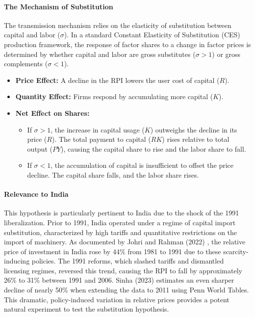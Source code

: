 \documentclass[12pt]{article}
\begin{document}
\paragraph{The Mechanism of Substitution}
The transmission mechanism relies on the elasticity of substitution between capital and labor ($\sigma$). In a standard Constant Elasticity of Substitution (CES) production framework, the response of factor shares to a change in factor prices is determined by whether capital and labor are gross substitutes ($\sigma > 1$) or gross complements ($\sigma < 1$).
\begin{itemize}[leftmargin=*,itemsep=4pt]
\item \textbf{Price Effect:} A decline in the RPI lowers the user cost of capital ($R$).
\item \textbf{Quantity Effect:} Firms respond by accumulating more capital ($K$).
\item \textbf{Net Effect on Shares:}
\begin{itemize}
\item If $\sigma > 1$, the increase in capital usage ($K$) outweighs the decline in its price ($R$). The total payment to capital ($RK$) rises relative to total output ($PY$), causing the capital share to rise and the labor share to fall.
\item If $\sigma < 1$, the accumulation of capital is insufficient to offset the price decline. The capital share falls, and the labor share rises.
\end{itemize}
\end{itemize}

\paragraph{Relevance to India}
This hypothesis is particularly pertinent to India due to the shock of the 1991 liberalization. Prior to 1991, India operated under a regime of capital import substitution, characterized by high tariffs and quantitative restrictions on the import of machinery. As documented by Johri and Rahman (2022) \citep{JohriRahman2022}, the relative price of investment in India rose by 44\% from 1981 to 1991 due to these scarcity-inducing policies. The 1991 reforms, which slashed tariffs and dismantled licensing regimes, reversed this trend, causing the RPI to fall by approximately 26\% to 31\% between 1991 and 2006. Sinha (2023) estimates an even sharper decline of nearly 50\% when extending the data to 2011 using Penn World Tables. This dramatic, policy-induced variation in relative prices provides a potent natural experiment to test the substitution hypothesis.
\end{document}
